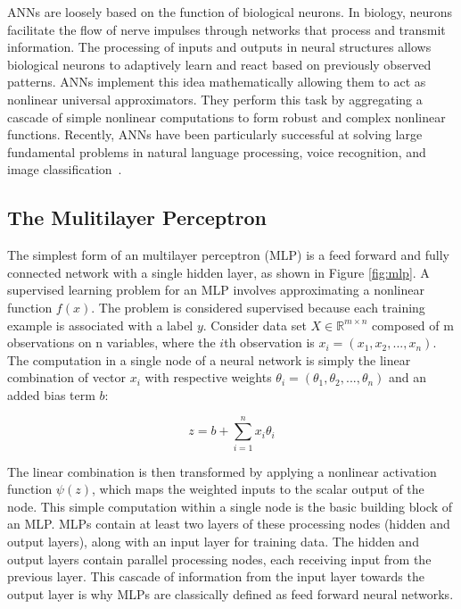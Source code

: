 ANNs are loosely based on the function of biological neurons. In biology, neurons facilitate the flow of nerve impulses through networks that process and transmit information. The processing of inputs and outputs in neural structures allows biological neurons to adaptively learn and react based on previously observed patterns. ANNs implement this idea mathematically allowing them to act as nonlinear universal approximators. They perform this task by aggregating a cascade of simple nonlinear computations to form robust and complex nonlinear functions. Recently, ANNs have been particularly successful at solving large fundamental problems in natural language processing, voice recognition, and image classification~\cite{collobert2011natural, hinton2012deep, cirecsan2012multi}. 

\subsection{The Mulitilayer Perceptron}

The simplest form of an multilayer perceptron (MLP) is a feed forward and fully connected network with a single hidden layer, as shown in Figure \ref{fig:mlp}. A supervised learning problem for an MLP involves approximating a nonlinear function $f(x)$. The problem is considered supervised because each training example is associated with a label $y$. Consider data set $X \in \mathbb{R}^{m\times n} $ composed of m observations on n variables, where the $i$th observation is $x_i = (x_1,x_2,...,x_n)$. The computation in a single node of a neural network is simply the linear combination of vector $x_i$ with respective weights $\theta_i = (\theta_1,\theta_2,...,\theta_n)$ and an added bias term $b$:

    \begin{equation} \label{eq:lincomb}
        z = b + \sum_{i=1}^{n}  x_i \theta_i
    \end{equation}

The linear combination is then transformed by applying a nonlinear activation function $\psi(z)$, which maps the weighted inputs to the scalar output of the node. This simple computation within a single node is the basic building block of an MLP. MLPs contain at least two layers of these processing nodes (hidden and output layers), along with an input layer for training data. The hidden and output layers contain parallel processing nodes, each receiving input from the previous layer. This cascade of information from the input layer towards the output layer is why MLPs are classically defined as feed forward neural networks. 

